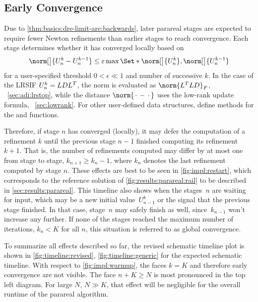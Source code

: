 \subsection{Early Convergence}
\label{sec:impl:pr:conv}

Due to \autoref{thm:basics:dre-limit-are:backwards},
later parareal stages are expected to require fewer Newton refinements than earlier stages to reach convergence.
Each stage determines whether it has converged locally based on
\begin{equation}
\label{eq:impl:pr:conv}
  \norm[\big]{U_n^k - U_n^{k-1}} \leq \epsilon \max\Set*{ \norm[\big]{U_n^k}, \norm[\big]{U_n^{k-1}} }
\end{equation}
for a user-specified threshold $0 < \epsilon \ll 1$
and number of successive $k$.
In the case of the \ac{LRSIF} $U_n^k = LDL^T$,
the norm is evaluated as $\norm{L^\T L D}_F$,
\cf~\autoref{sec:adi:lrstop},
while the distance $\norm{\optional{} - \optional{}}$ uses the low-rank update formula,
\cf~\autoref{sec:lowrank}.
For other user-defined data structures,
define methods for the  and  functions.

Therefore, if stage $n$ has converged (locally),
it may defer the computation of a refinement $k$
until the previous stage $n-1$ finished computing its refinement $k+1$.
That is, the number of refinements computed may differ by at most one from stage to stage,
\ie $k_{n+1} \geq k_n -1$,
where $k_n$ denotes the last refinement computed by stage $n$.
These effects are best to be seen in \autoref{fig:impl:restart},
which corresponds to the reference solution of \autoref{fig:results:parareal:rail} to be described in \autoref{sec:results:parareal}.
This timeline also shows when the stages~$n$ are waiting for input,
which may be a new initial value~$U_{n-1}^k$ or the signal that the previous stage finished.
In that case, stage~$n$ may safely finish as well,
since~$k_{n-1}$ won't increase any further.
If none of the stages reached the maximum number of iterations,
\ie $k_n < K$ for all $n$,
this situation is referred to as global convergence.

To summarize all effects described so far,
the revised schematic timeline plot is shown in \autoref{fig:timeline:revised},
\cf \autoref{fig:timeline:generic} for the expected schematic timeline.
With respect to \autoref{fig:impl:warmup},
the faces $k=K$ and therefore early convergence are not visible.
The face $n+K \geq N$ is most pronounced in the top left diagram.
For large $N$, $N \gg K$, that effect will be negligible for the overall runtime of the parareal algorithm.

